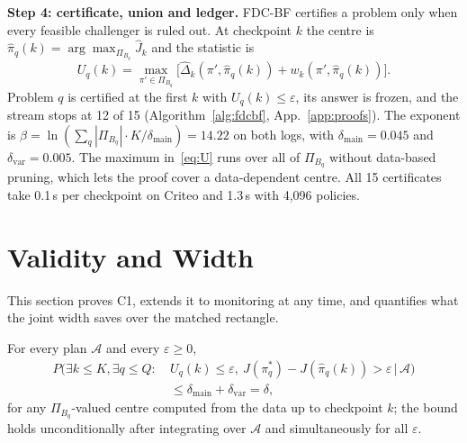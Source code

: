 \documentclass[sigconf,anonymous,review]{acmart}
\newcommand{\cA}{\mathcal{A}}
\newcommand{\eps}{\varepsilon}
\newcommand{\dmain}{\delta_{\text{main}}}
\newcommand{\dvar}{\delta_{\text{var}}}
\begin{document}
\textbf{Step 4: certificate, union and ledger.} FDC-BF certifies a problem only when every feasible challenger is ruled out. At checkpoint $k$ the centre is $\hat\pi_q(k) = \arg\max_{\Pi_{B_q}} \hat J_k$ and the statistic is
\begin{equation}\label{eq:U}
U_q(k) = \max_{\pi' \in \Pi_{B_q}}\big[\hat\Delta_k(\pi', \hat\pi_q(k)) + w_k(\pi', \hat\pi_q(k))\big].
\end{equation}
Problem $q$ is certified at the first $k$ with $U_q(k) \le \eps$, its answer is frozen, and the stream stops at 12 of 15 (Algorithm~\ref{alg:fdcbf}, App.~\ref{app:proofs}). The exponent is $\beta = \ln(\sum_q |\Pi_{B_q}| \cdot K/\dmain) = 14.22$ on both logs, with $\dmain = 0.045$ and $\dvar = 0.005$. The maximum in~\eqref{eq:U} runs over all of $\Pi_{B_q}$ without data-based pruning, which lets the proof cover a data-dependent centre. All 15 certificates take 0.1\,s per checkpoint on Criteo and 1.3\,s with 4,096 policies.

\section{Validity and Width}\label{sec:validity}

This section proves C1, extends it to monitoring at any time, and quantifies what the joint width saves over the matched rectangle.

\begin{theorem}\label{thm:fdcbet}
For every plan $\cA$ and every $\eps \ge 0$,
\[
\begin{aligned}
P\big(\exists k \le K, \exists q \le Q:\ & U_q(k) \le \eps,\ J(\pi^*_q) - J(\hat\pi_q(k)) > \eps \,\big|\, \cA\big)\\
&\le \dmain + \dvar = \delta,
\end{aligned}
\]
for any $\Pi_{B_q}$-valued centre computed from the data up to checkpoint $k$; the bound holds unconditionally after integrating over $\cA$ and simultaneously for all $\eps$.
\end{theorem}
\end{document}
